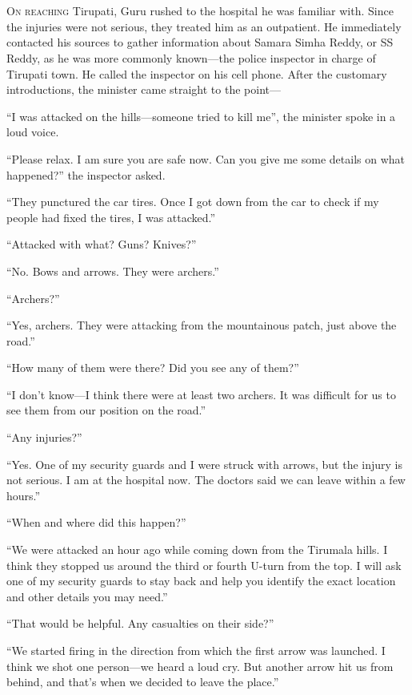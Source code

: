 \chapter{}

\lettrine{O}{n reaching} Tirupati, Guru rushed to the hospital he was familiar
with. Since the injuries were not serious, they treated him as an outpatient. He
immediately contacted his sources to gather information about Samara Simha Reddy, or SS
Reddy, as he was more commonly known—the police inspector in charge of Tirupati
town. He called the inspector on his cell phone. After the customary
introductions, the minister came straight to the point—

“I was attacked on the hills—someone tried to kill me”, the minister spoke in
a loud voice.

“Please relax. I am sure you are safe now. Can you give me some details on what
happened?” the inspector asked.

“They punctured the car tires. Once I got down from the car to check if my
people had fixed the tires, I was attacked.”

“Attacked with what? Guns? Knives?”

“No. Bows and arrows. They were archers.”

“Archers?”

“Yes, archers. They were attacking from the mountainous patch, just above the
road.”

“How many of them were there? Did you see any of them?”

“I don't know—I think there were at least two archers. It was difficult for us
to see them from our position on the road.”

“Any injuries?”

“Yes. One of my security guards and I were struck with arrows, but the injury is
not serious. I am at the hospital now. The doctors said we can leave within a
few hours.”

“When and where did this happen?”

“We were attacked an hour ago while coming down from the Tirumala hills. I
think they stopped us around the third or fourth U-turn from the top. I will ask
one of my security guards to stay back and help you identify the exact location
and other details you may need.”

“That would be helpful. Any casualties on their side?”

“We started firing in the direction from which the first arrow was launched. I
think we shot one person—we heard a loud cry. But another arrow hit us from
behind, and that's when we decided to leave the place.”

